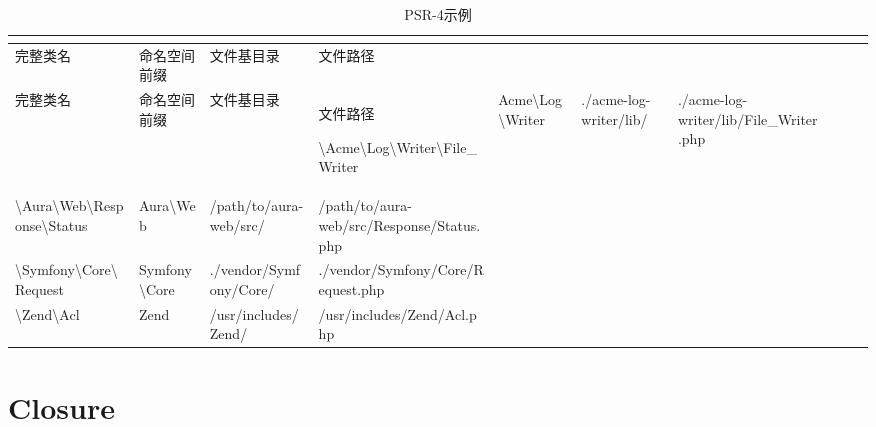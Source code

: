 \begin{longtable}{|m{60pt}|m{40pt}|m{40pt}|m{100pt}|}
\tabularnewline\hline
完整类名&命名空间前缀&文件基目录&文件路径
\endhead

\caption{PSR-4示例}\\
\hline
完整类名&命名空间前缀&文件基目录&文件路径
\endfirsthead

\endfoot

\endlastfoot
\hline
\textbackslash Acme\textbackslash Log\textbackslash Writer\textbackslash File\_Writer&Acme\textbackslash Log\textbackslash Writer&./acme-log-writer/lib/&./acme-log-writer/lib/File\_Writer.php\\
\hline
\textbackslash Aura\textbackslash Web\textbackslash Response\textbackslash Status&Aura\textbackslash Web&/path/to/aura-web/src/&/path/to/aura-web/src/Response/Status.php\\
\hline
\textbackslash Symfony\textbackslash Core\textbackslash Request&Symfony\textbackslash Core&./vendor/Symfony/Core/&./vendor/Symfony/Core/Request.php\\
\hline
\textbackslash Zend\textbackslash Acl	&Zend&/usr/includes/Zend/&/usr/includes/Zend/Acl.php\\
\hline
\end{longtable}

\section{Closure}




